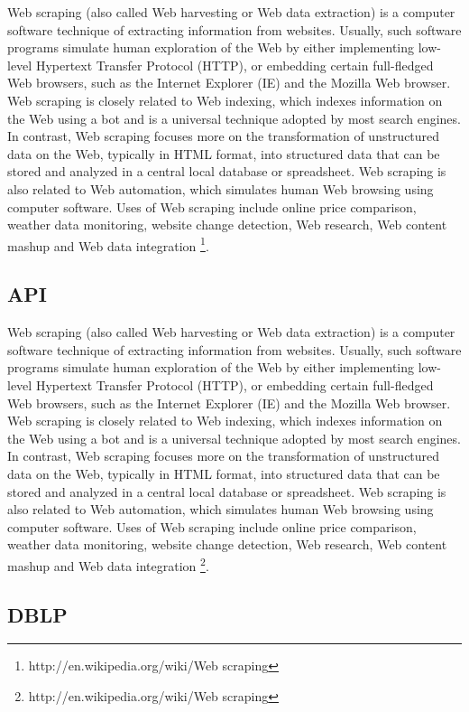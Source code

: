 Web scraping (also called Web harvesting or Web data extraction) is a computer software technique of extracting information from websites. Usually, such software programs simulate human exploration of the Web by either implementing low-level Hypertext Transfer Protocol (HTTP), or embedding certain full-fledged Web browsers, such as the Internet Explorer (IE) and the Mozilla Web browser. Web scraping is closely related to Web indexing, which indexes information on the Web using a bot and is a universal technique adopted by most search engines. In contrast, Web scraping focuses more on the transformation of unstructured data on the Web, typically in HTML format, into structured data that can be stored and analyzed in a central local database or spreadsheet. Web scraping is also related to Web automation, which simulates human Web browsing using computer software. Uses of Web scraping include online price comparison, weather data monitoring, website change detection, Web research, Web content mashup and Web data integration \footnote{http://en.wikipedia.org/wiki/Web scraping}.

\subsection{API}

Web scraping (also called Web harvesting or Web data extraction) is a computer software technique of extracting information from websites. Usually, such software programs simulate human exploration of the Web by either implementing low-level Hypertext Transfer Protocol (HTTP), or embedding certain full-fledged Web browsers, such as the Internet Explorer (IE) and the Mozilla Web browser. Web scraping is closely related to Web indexing, which indexes information on the Web using a bot and is a universal technique adopted by most search engines. In contrast, Web scraping focuses more on the transformation of unstructured data on the Web, typically in HTML format, into structured data that can be stored and analyzed in a central local database or spreadsheet. Web scraping is also related to Web automation, which simulates human Web browsing using computer software. Uses of Web scraping include online price comparison, weather data monitoring, website change detection, Web research, Web content mashup and Web data integration \footnote{http://en.wikipedia.org/wiki/Web scraping}.

\subsection{DBLP}

